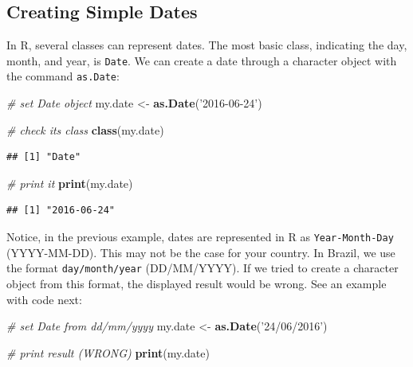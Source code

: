 \documentclass[11pt,]{book}
\newenvironment{Shaded}{\begin{snugshade}}{\end{snugshade}}
\newcommand{\KeywordTok}[1]{\textcolor[rgb]{0.27,0.27,0.27}{\textbf{#1}}}
\newcommand{\StringTok}[1]{\textcolor[rgb]{0.5,0.5,0.5}{#1}}
\newcommand{\CommentTok}[1]{\textcolor[rgb]{0.56,0.35,0.01}{\textit{#1}}}
\newcommand{\NormalTok}[1]{#1}
\begin{document}
\subsection{Creating Simple Dates}\label{creating-simple-dates}

In R, several classes can represent dates. The most basic class,
indicating the day, month, and year, is \texttt{Date}. We can create a
date through a character object with the command \texttt{as.Date}:
 

\begin{Shaded}
\begin{Highlighting}[]
\CommentTok{# set Date object}
\NormalTok{my.date <-}\StringTok{ }\KeywordTok{as.Date}\NormalTok{(}\StringTok{'2016-06-24'}\NormalTok{)}

\CommentTok{# check its class}
\KeywordTok{class}\NormalTok{(my.date)}
\end{Highlighting}
\end{Shaded}

\begin{verbatim}
## [1] "Date"
\end{verbatim}

\begin{Shaded}
\begin{Highlighting}[]
\CommentTok{# print it}
\KeywordTok{print}\NormalTok{(my.date)}
\end{Highlighting}
\end{Shaded}

\begin{verbatim}
## [1] "2016-06-24"
\end{verbatim}

Notice, in the previous example, dates are represented in R as
\texttt{Year-Month-Day} (YYYY-MM-DD). This may not be the case for your
country. In Brazil, we use the format \texttt{day/month/year}
(DD/MM/YYYY). If we tried to create a character object from this format,
the displayed result would be wrong. See an example with code next:

\begin{Shaded}
\begin{Highlighting}[]
\CommentTok{# set Date from dd/mm/yyyy }
\NormalTok{my.date <-}\StringTok{ }\KeywordTok{as.Date}\NormalTok{(}\StringTok{'24/06/2016'}\NormalTok{)}

\CommentTok{# print result (WRONG)}
\KeywordTok{print}\NormalTok{(my.date)}
\end{Highlighting}
\end{Shaded}
\end{document}
